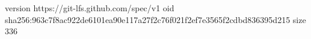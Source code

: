version https://git-lfs.github.com/spec/v1
oid sha256:963c7f8ac922de6101ea90e117a27f2c76f021f2ef7e3565f2cdbd836395d215
size 336
